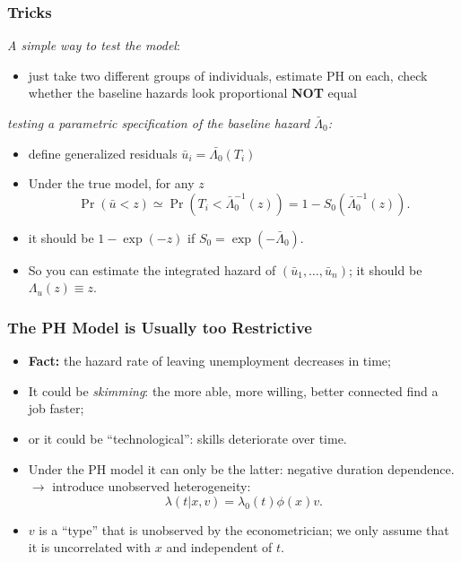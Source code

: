 \documentclass[xcolor=pdftex,dvipsnames,table,mathserif]{beamer}
\begin{document}
\begin{frame}
\frametitle{Tricks}

{\em A simple way to test the model}:
\begin{itemize}
\item just take two different groups of individuals, estimate PH on each, check whether the baseline
hazards look \alert{proportional} \textbf{NOT} \alert{equal}
\end{itemize}

 {\em testing a  parametric specification of the baseline
hazard $\bar{\Lambda}_0$:} 
\begin{itemize}
\item define  generalized residuals $\bar{u}_i=\bar{\Lambda_0}(T_i)$
\item Under the true  model, for any $z$
\[
\Pr(\bar{u} <z) \simeq
\Pr(T_i<\bar{\Lambda}_0^{-1}(z))=1-S_0(\bar{\Lambda}_0^{-1}(z)).
 \]
\item it should be $1-\exp(-z)$ if $S_0=\exp(-\bar{\Lambda}_0)$.
\item So you can estimate the integrated hazard of
 $(\bar{u}_1,\ldots,\bar{u}_n)$; it should be $\Lambda_u(z) \equiv z$.
\end{itemize}
\end{frame}


\begin{frame}
\frametitle{The PH Model is Usually too Restrictive}
\begin{itemize}
\item {\bf Fact:}  the hazard rate of leaving unemployment decreases
in time;
\item It could be {\em skimming}: the more able, more willing, better
connected find a job faster;
\item or it could be ``technological'': skills deteriorate over time.
\item Under the PH model it can only be the latter: negative duration
dependence. $\rightarrow$ introduce unobserved heterogeneity:
\[
\lambda(t \vert x,v)=\lambda_0(t)\phi(x) v.
\]
\item $v$ is a ``type'' that is unobserved by the econometrician; we
only assume that it is uncorrelated with $x$ and independent of $t$.
\end{itemize}
\end{frame}
\end{document}
